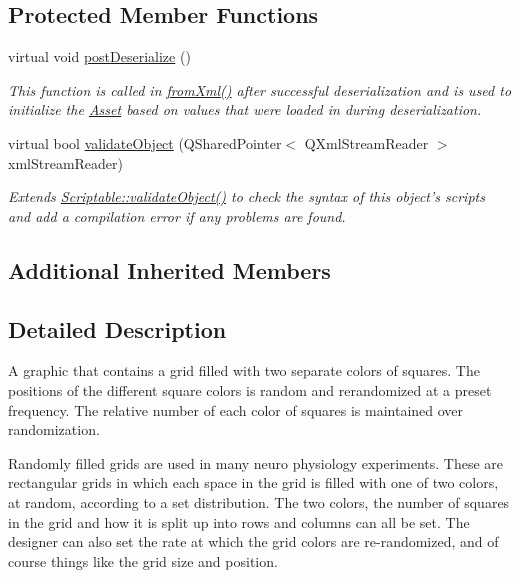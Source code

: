 \subsection*{Protected Member Functions}
\begin{DoxyCompactItemize}
\item 
virtual void \hyperlink{class_picto_1_1_randomly_filled_grid_graphic_a0aba9d31a08ad997a9d2016a275015db}{post\-Deserialize} ()
\begin{DoxyCompactList}\small\item\em This function is called in \hyperlink{class_picto_1_1_asset_a8bed4da09ecb1c07ce0dab313a9aba67}{from\-Xml()} after successful deserialization and is used to initialize the \hyperlink{class_picto_1_1_asset}{Asset} based on values that were loaded in during deserialization. \end{DoxyCompactList}\item 
\hypertarget{class_picto_1_1_randomly_filled_grid_graphic_a9c2ebca96f54fe0d1b254f738a5bd572}{virtual bool \hyperlink{class_picto_1_1_randomly_filled_grid_graphic_a9c2ebca96f54fe0d1b254f738a5bd572}{validate\-Object} (Q\-Shared\-Pointer$<$ Q\-Xml\-Stream\-Reader $>$ xml\-Stream\-Reader)}\label{class_picto_1_1_randomly_filled_grid_graphic_a9c2ebca96f54fe0d1b254f738a5bd572}

\begin{DoxyCompactList}\small\item\em Extends \hyperlink{class_picto_1_1_scriptable_ab6e2944c43a3b5d418bf7b251594386d}{Scriptable\-::validate\-Object()} to check the syntax of this object's scripts and add a compilation error if any problems are found. \end{DoxyCompactList}\end{DoxyCompactItemize}
\subsection*{Additional Inherited Members}


\subsection{Detailed Description}
A graphic that contains a grid filled with two separate colors of squares. The positions of the different square colors is random and rerandomized at a preset frequency. The relative number of each color of squares is maintained over randomization. 

Randomly filled grids are used in many neuro physiology experiments. These are rectangular grids in which each space in the grid is filled with one of two colors, at random, according to a set distribution. The two colors, the number of squares in the grid and how it is split up into rows and columns can all be set. The designer can also set the rate at which the grid colors are re-\/randomized, and of course things like the grid size and position.

